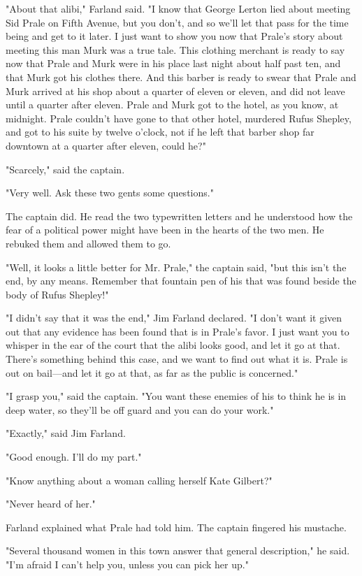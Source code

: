 \documentclass{novel}
\begin{document}
"About that alibi," Farland said. "I know that George Lerton lied about meeting Sid Prale on Fifth Avenue, but you don't, and so we'll let that pass for the time being and get to it later. I just want to show you now that Prale's story about meeting this man Murk was a true tale. This clothing merchant is ready to say now that Prale and Murk were in his place last night about half past ten, and that Murk got his clothes there. And this barber is ready to swear that Prale and Murk arrived at his shop about a quarter of eleven or eleven, and did not leave until a quarter after eleven. Prale and Murk got to the hotel, as you know, at midnight. Prale couldn't have gone to that other hotel, murdered Rufus Shepley, and got to his suite by twelve o'clock, not if he left that barber shop far downtown at a quarter after eleven, could he?"

"Scarcely," said the captain.

"Very well. Ask these two gents some questions."

The captain did. He read the two typewritten letters and he understood how the fear of a political power might have been in the hearts of the two men. He rebuked them and allowed them to go.

"Well, it looks a little better for Mr. Prale," the captain said, "but this isn't the end, by any means. Remember that fountain pen of his that was found beside the body of Rufus Shepley!"

"I didn't say that it was the end," Jim Farland declared. "I don't want it given out that any evidence has been found that is in Prale's favor. I just want you to whisper in the ear of the court that the alibi looks good, and let it go at that. There's something behind this case, and we want to find out what it is. Prale is out on bail---and let it go at that, as far as the public is concerned."

"I grasp you," said the captain. "You want these enemies of his to think he is in deep water, so they'll be off guard and you can do your work."

"Exactly," said Jim Farland.

"Good enough. I'll do my part."

"Know anything about a woman calling herself Kate Gilbert?"

"Never heard of her."

Farland explained what Prale had told him. The captain fingered his mustache.

"Several thousand women in this town answer that general description," he said. "I'm afraid I can't help you, unless you can pick her up."
\end{document}
